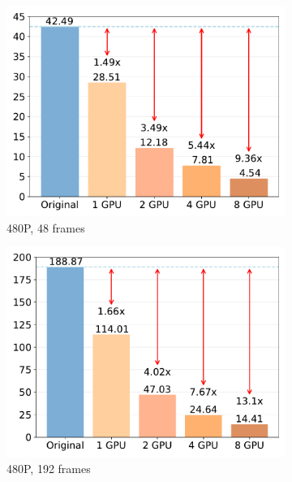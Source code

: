 \begin{figure}
    \centering
    \begin{minipage}{\textwidth}
    \centering
    \begin{subfigure}{0.24\textwidth}
        \centering
        \includegraphics[width=\textwidth]{figs/480_48.pdf} 
        \caption{480P, 48 frames}
    \end{subfigure}
    \hfill
    \begin{subfigure}{0.24\textwidth}
        \centering
        \includegraphics[width=\textwidth]{figs/480_192.pdf} 
        \caption{480P, 192 frames}
    \end{subfigure}
    \hfill
    \begin{subfigure}{0.24\textwidth}

\end{subfigure}
\end{minipage}
\end{figure}
